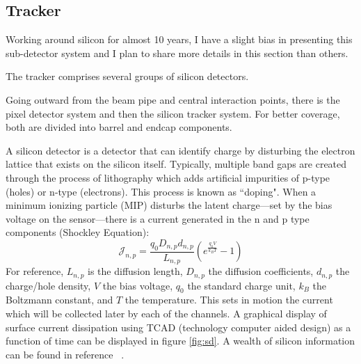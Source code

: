 \subsection{Tracker}
Working around silicon for almost 10 years, I have a slight bias in presenting this sub-detector system and I plan to share more details in this section than others. 

The tracker comprises several groups of silicon detectors. 


Going outward from the beam pipe and central interaction points, there is the pixel detector system and then the silicon tracker system. For better coverage, both are divided into barrel and endcap components. 

A silicon detector is a detector that can identify charge by disturbing the electron lattice that exists on the silicon itself. 
Typically, multiple band gaps are created through the process of lithography which adds artificial impurities of p-type (holes) or n-type (electrons). This process is known as ``doping". When a minimum ionizing particle (MIP) disturbs the latent charge---set by the bias voltage on the sensor---there is a current generated in the n and p type components (Shockley Equation):
\begin{equation}
\label{eq:shockleyn}
\mathcal{J}_{n,p} = \frac{q_0 D_{n,p} d_{n,p}}{L_{n,p}}\left(e^{\frac{q_0 V}{k_B T}} - 1 \right)
\end{equation}
For reference, $L_{n,p}$ is the diffusion length, $D_{n,p}$ the diffusion coefficients, $d_{n,p}$ the charge/hole density, $V$ the bias voltage, $q_0$ the standard charge unit, $k_B$ the Boltzmann constant, and $T$ the temperature. 
This sets in motion the current which will be collected later by each of the channels. A graphical display of surface current dissipation using TCAD (technology computer aided design) as a function of time can be displayed in figure \ref{fig:sd}. A wealth of silicon information can be found in reference ~\cite{Eichhorn:2112017}.

